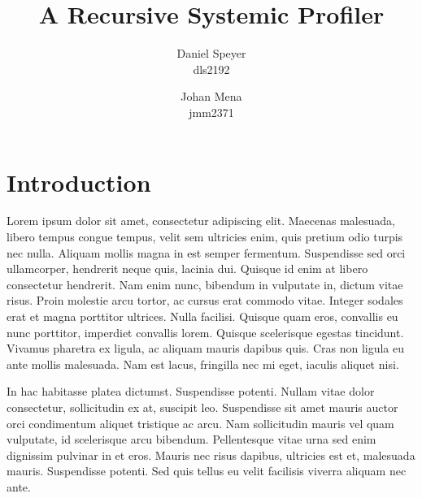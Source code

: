 \documentclass[10pt]{article}
\begin{document}
\author{Daniel Speyer\\dls2192 \and Johan Mena\\jmm2371}
\title{A Recursive Systemic Profiler}


\section{Introduction}
 Lorem ipsum dolor sit amet, consectetur adipiscing elit. Maecenas malesuada, libero tempus congue tempus, velit sem ultricies enim, quis pretium odio turpis nec nulla. Aliquam mollis magna in est semper fermentum. Suspendisse sed orci ullamcorper, hendrerit neque quis, lacinia dui. Quisque id enim at libero consectetur hendrerit. Nam enim nunc, bibendum in vulputate in, dictum vitae risus. Proin molestie arcu tortor, ac cursus erat commodo vitae. Integer sodales erat et magna porttitor ultrices. Nulla facilisi. Quisque quam eros, convallis eu nunc porttitor, imperdiet convallis lorem. Quisque scelerisque egestas tincidunt. Vivamus pharetra ex ligula, ac aliquam mauris dapibus quis. Cras non ligula eu ante mollis malesuada. Nam est lacus, fringilla nec mi eget, iaculis aliquet nisi.

In hac habitasse platea dictumst. Suspendisse potenti. Nullam vitae dolor consectetur, sollicitudin ex at, suscipit leo. Suspendisse sit amet mauris auctor orci condimentum aliquet tristique ac arcu. Nam sollicitudin mauris vel quam vulputate, id scelerisque arcu bibendum. Pellentesque vitae urna sed enim dignissim pulvinar in et eros. Mauris nec risus dapibus, ultricies est et, malesuada mauris. Suspendisse potenti. Sed quis tellus eu velit facilisis viverra aliquam nec ante.
\end{document}
